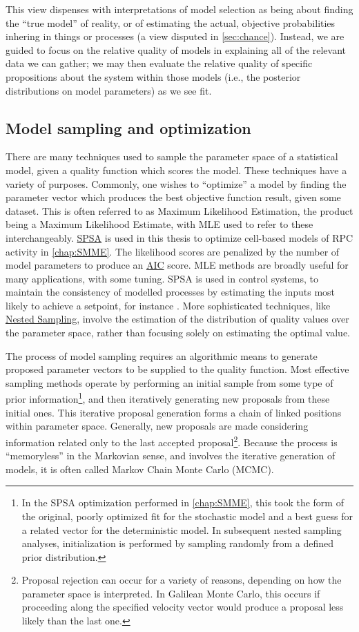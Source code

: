 This view dispenses with interpretations of model selection as being about finding the ``true model'' of reality, or of estimating the actual, objective probabilities inhering in things or processes (a view disputed in \autoref{sec:chance}). Instead, we are guided to focus on the relative quality of models in explaining all of the relevant data we can gather; we may then evaluate the relative quality of specific propositions about the system within those models (i.e., the posterior distributions on model parameters) as we see fit.  

\subsection{Model sampling and optimization}
\label{ssec:MLE}
There are many techniques used to sample the parameter space of a statistical model, given a quality function which scores the model. These techniques have a variety of purposes. Commonly, one wishes to ``optimize'' a model by finding the parameter vector which produces the best objective function result, given some dataset. This is often referred to as Maximum Likelihood Estimation, the product being a Maximum Likelihood Estimate, with MLE used to refer to these interchangeably. \hyperref[ssec:SPSA]{SPSA} is used in this thesis to optimize cell-based models of RPC activity in \autoref{chap:SMME}. The likelihood scores are penalized by the number of model parameters to produce an \hyperref[ssec:AIC]{AIC} score. MLE methods are broadly useful for many applications, with some tuning. SPSA is used in control systems, to maintain the consistency of modelled processes by estimating the inputs most likely to achieve a setpoint, for instance \cite{Zhou2008}. More sophisticated techniques, like \hyperref[ssec:nested]{Nested Sampling}, involve the estimation of the distribution of quality values over the parameter space, rather than focusing solely on estimating the optimal value.

The process of model sampling requires an algorithmic means to generate proposed parameter vectors to be supplied to the quality function. Most effective sampling methods operate by performing an initial sample from some type of prior information\footnote{In the SPSA optimization performed in \autoref{chap:SMME}, this took the form of the original, poorly optimized fit for the stochastic model and a best guess for a related vector for the deterministic model. In subsequent nested sampling analyses, initialization is performed by sampling randomly from a defined prior distribution.}, and then iteratively generating new proposals from these initial ones. This iterative proposal generation forms a chain of linked positions within parameter space. Generally, new proposals are made considering information related only to the last accepted proposal\footnote{Proposal rejection can occur for a variety of reasons, depending on how the parameter space is interpreted. In Galilean Monte Carlo, this occurs if proceeding along the specified velocity vector would produce a proposal less likely than the last one.}. Because the process is ``memoryless'' in the Markovian sense, and involves the iterative generation of models, it is often called Markov Chain Monte Carlo (MCMC).

